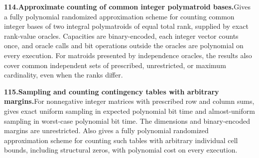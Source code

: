 \documentclass[11pt,a4paper]{article}
\begin{document}
  \par \begin{minipage}{\linewidth}
  \fontsize{10.5}{12.6}\selectfont\RaggedRight
  \hypertarget{result 114}{}
  {\bfseries\textcolor{muted}{114.}\enspace Approximate counting of common integer polymatroid bases.}\enspace Gives a fully polynomial randomized approximation scheme for counting common integer bases of two integral polymatroids of equal total rank, supplied by exact rank-value oracles. Capacities are binary-encoded, each integer vector counts once, and oracle calls and bit operations outside the oracles are polynomial on every execution. For matroids presented by independence oracles, the results also cover common independent sets of prescribed, unrestricted, or maximum cardinality, even when the ranks differ.\par
  \end{minipage}\par\vspace{5pt}



  \par \begin{minipage}{\linewidth}
  \fontsize{10.5}{12.6}\selectfont\RaggedRight
  \hypertarget{result 115}{}
  {\bfseries\textcolor{muted}{115.}\enspace Sampling and counting contingency tables with arbitrary margins.}\enspace For nonnegative integer matrices with prescribed row and column sums, gives exact uniform sampling in expected polynomial bit time and almost-uniform sampling in worst-case polynomial bit time. The dimensions and binary-encoded margins are unrestricted. Also gives a fully polynomial randomized approximation scheme for counting such tables with arbitrary individual cell bounds, including structural zeros, with polynomial cost on every execution.\par
  \end{minipage}\par\vspace{5pt}
\end{document}
